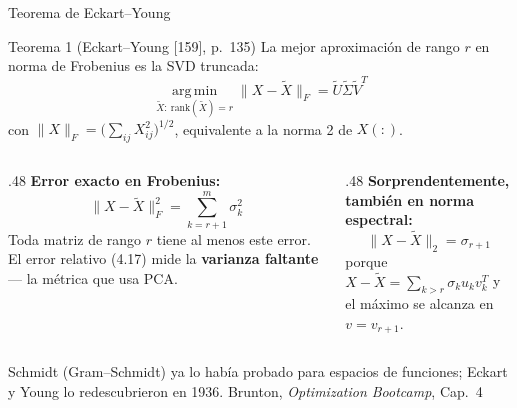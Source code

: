 \documentclass[10pt,aspectratio=169]{beamer}
\newcommand{\fuente}{\vfill{\scriptsize\color{gray}Brunton, \emph{Optimization Bootcamp}, Cap.~4}}
\newcommand{\rk}{\mathrm{rank}}
\newcommand{\argmin}{\operatorname*{arg\,min}}
\begin{document}
\begin{frame}{Teorema de Eckart--Young}
  \small
  \begin{block}{Teorema 1 (Eckart--Young [159], p.~135)}
    La mejor aproximación de rango $r$ en norma de Frobenius es la SVD truncada:
    \[
      \argmin_{\tilde{X}:\ \rk(\tilde{X})=r} \|X - \tilde{X}\|_F
      = \tilde{U}\tilde{\Sigma}\tilde{V}^T \tag{4.15}
    \]
    con $\|X\|_F = \big(\sum_{ij} X_{ij}^2\big)^{1/2}$, equivalente a la
    norma 2 de $X(:)$.
  \end{block}

  \begin{columns}[T,onlytextwidth]
    \begin{column}{.48\textwidth}
      \textbf{Error exacto en Frobenius:}
      \[
        \|X - \tilde{X}\|_F^2 = \sum_{k=r+1}^{m} \sigma_k^2 \tag{4.16}
      \]
      \scriptsize Toda matriz de rango $r$ tiene al menos este error.
      El error relativo (4.17) mide la \textbf{varianza faltante} --- la
      métrica que usa PCA.
    \end{column}
    \begin{column}{.48\textwidth}
      \textbf{Sorprendentemente, también en norma espectral:}
      \[
        \|X - \tilde{X}\|_2 = \sigma_{r+1} \tag{4.19}
      \]
      \scriptsize porque
      $X-\tilde{X} = \sum_{k>r}\sigma_k u_k v_k^T$ y el máximo se alcanza en
      $v = v_{r+1}$.
    \end{column}
  \end{columns}

  \vspace{1mm}
  \footnotesize
  Schmidt (Gram--Schmidt) ya lo había probado para espacios de funciones;
  Eckart y Young lo redescubrieron en 1936.
  \fuente
\end{frame}
\end{document}
